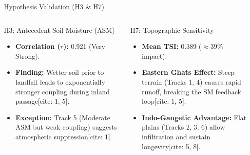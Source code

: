 \begin{frame}{Hypothesis Validation (H3 \& H7)}
	\footnotesize
	\begin{columns}[T]
		\begin{block}{H3: Antecedent Soil Moisture (ASM)}
			\begin{itemize}
				\item \textbf{Correlation ($r$):} 0.921 (Very Strong).
				\item \textbf{Finding:} Wetter soil prior to landfall leads to exponentially stronger coupling during inland passage[cite: 1, 5].
				\item \textbf{Exception:} Track 5 (Moderate ASM but weak coupling) suggests atmospheric suppression[cite: 1].
			\end{itemize}
		\end{block}

		\begin{block}{H7: Topographic Sensitivity}
			\begin{itemize}
				\item \textbf{Mean TSI:} 0.389 ($\approx 39\%$ impact).
				\item \textbf{Eastern Ghats Effect:} Steep terrain (Tracks 1, 4) causes rapid runoff, breaking the SM feedback loop[cite: 1, 5].
				\item \textbf{Indo-Gangetic Advantage:} Flat plains (Tracks 2, 3, 6) allow infiltration and sustain longevity[cite: 5, 8].
			\end{itemize}
		\end{block}
	\end{columns}
\end{frame}

